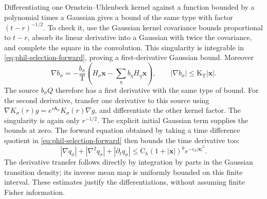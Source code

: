 Differentiating one Ornstein--Uhlenbeck kernel against a function bounded
by a polynomial times a Gaussian gives a bound of the same type with
factor \((t-r)^{-1/2}\). To check it, use the Gaussian kernel covariance
bounds proportional to \(t-r\), absorb its linear derivative into a
Gaussian with twice the covariance, and complete the square in the
convolution. This singularity is integrable in
\cref{eq:phil-selection-forward}, proving a first-derivative Gaussian
bound. Moreover
\[
 \nabla b_\sigma=-\frac{b_\sigma}{\mathrm T}
       \left(H_\sigma\mathbf x-\sum_\eta b_\eta H_\eta\mathbf x\right),
 \qquad |\nabla b_\sigma|\le\mathrm K_{\mathrm T}|\mathbf x|.
\]
The source \(b_\sigma Q\) therefore has a first derivative with the same
type of bound. For the second derivative, transfer one derivative to this
source using
\(\nabla K_\sigma(r)g=e^{r\mathsf A_\sigma}K_\sigma(r)\nabla g\),
and differentiate the other kernel factor. The singularity is again only
\(r^{-1/2}\). The explicit initial Gaussian term supplies the bounds at
zero. The forward equation obtained by taking a time difference quotient
in \cref{eq:phil-selection-forward} then bounds the time derivative too:
\begin{equation}
 |\nabla q_\sigma|+|\nabla^2q_\sigma|+|\partial_tq_\sigma|
 \le\mathrm C_h(1+|\mathbf x|)^k e^{-\mathrm c_h|\mathbf x|^2}.
\label{eq:phil-selection-density-derivatives}
\end{equation}
The derivative transfer follows directly by integration by parts in the
Gaussian transition density; its inverse mean map is uniformly bounded
on this finite interval. These estimates justify the differentiations,
without assuming finite Fisher information.


